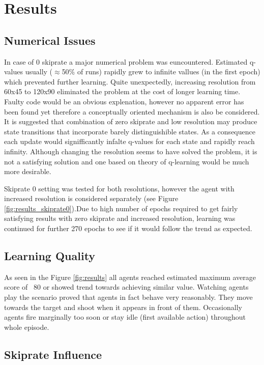 \section{Results}
	\subsection{Numerical Issues}
		In case of 0 skiprate a major numerical problem was euncountered. Estimated q-values usually ($\approx$50\% of runs) rapidly grew to infinite vallues (in the first epoch) which prevented further learning. Quite unexpectedly, increasing resolution from 60x45 to 120x90 eliminated the problem at the cost of longer learning time. Faulty code would be an obvious explenation, however no apparent error has been found yet therefore a conceptually oriented mechanism is also be considered. It is suggested that combination of zero skiprate and low resolution may produce state transitions that incorporate barely distinguishible states. As a consequence each update would signifficantly infalte q-values for each state and rapidly reach infinity. Although changing the resolution seems to have solved the problem, it is not a satisfying solution and one based on theory of q-learning would be much more desirable.

		Skiprate 0 setting was tested for both resolutions, however the agent with increased resolution is considered separately (see Figure \ref{fig:results_skiprate0}).Due to high number of epochs required to get fairly satisfying results with zero skiprate and increased resolution, learning was continued for further 270 epochs to see if it would follow the trend as expected.

	\subsection{Learning Quality}
		As seen in the Figure \ref{fig:results} all agents reached estimated maximum average score of ~80 or showed trend towards achieving similar value. Watching agents play the scenario proved that agents in fact behave very reasonably. They move towards the target and shoot when it appears in front of them. Occasionally agents fire marginally too soon or stay idle (first available action) throughout whole episode. 

	\subsection{Skiprate Influence}
		
